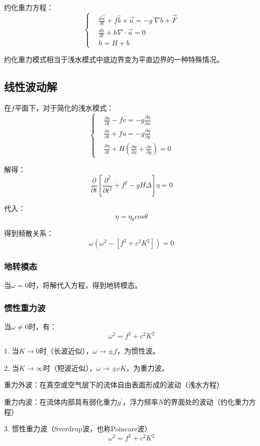 \documentclass{article}
\begin{document}
约化重力方程：
$$\begin{cases}
    &\frac{d\vec{u}}{dt} + f\hat{k}\times\vec{u} = -g^{\prime}\nabla b + \vec{F}\\
    &\frac{dh}{dt} + h\nabla\cdot\vec{u} = 0\\
    &h=H+b
\end{cases}$$

约化重力模式相当于浅水模式中底边界变为平直边界的一种特殊情况。

\subsection{线性波动解}
在$f$平面下，对于简化的浅水模式：
$$\begin{cases}
    &\frac{\partial u}{\partial t}-fv=-g\frac{\partial \eta}{\partial x}\\
    &\frac{\partial v}{\partial t}+fu=-g\frac{\partial \eta}{\partial y}\\
    &\frac{\partial \eta}{\partial t}+H(\frac{\partial u}{\partial x}+\frac{\partial v}{\partial y} ) = 0
\end{cases}$$

解得：
$$\frac{\partial }{\partial t}\left[\frac{\partial^2 }{\partial t^2}+f^2-gH\Delta\right]\eta=0 $$

代入：
$$\eta = \eta_0cos\theta$$

得到频散关系：
$$\omega\left(\omega^2-[f^2+c^2K^2]\right)=0$$

\subsubsection{地转模态}
当$\omega=0$时，将解代入方程，得到地转模态。

\subsubsection{惯性重力波}
当$\omega\ne0$时，有：
$$\omega^2 = f^2+c^2K^2$$

1. 当$K \rightarrow 0$时（长波近似），$\omega\rightarrow\pm f$，为惯性波。

2. 当$K \rightarrow \infty$时（短波近似），$\omega\rightarrow\pm cK$，为重力波。

重力外波：在真空或空气层下的流体自由表面形成的波动（浅水方程）

重力内波：在流体内部具有弱化重力$g^{\prime}$，浮力频率$N$的界面处的波动（约化重力方程）

3. 惯性重力波（Sverdrup波，也称Poincare波）
$$\omega^2 = f^2+c^2K^2$$
\end{document}
